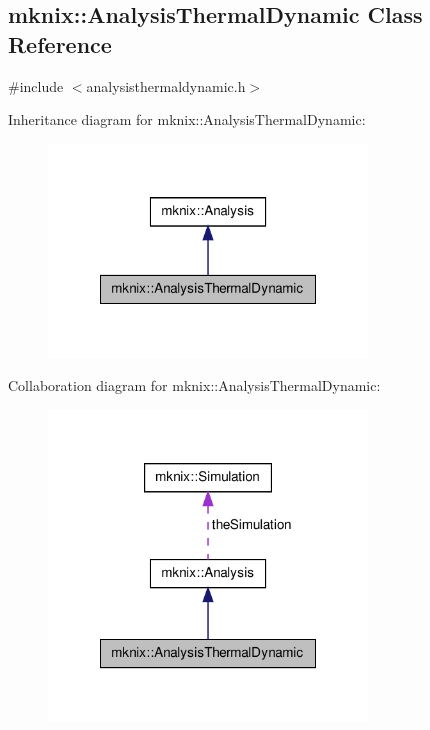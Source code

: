 \hypertarget{classmknix_1_1_analysis_thermal_dynamic}{\subsection{mknix\-:\-:Analysis\-Thermal\-Dynamic Class Reference}
\label{classmknix_1_1_analysis_thermal_dynamic}
}


{\ttfamily \#include $<$analysisthermaldynamic.\-h$>$}



Inheritance diagram for mknix\-:\-:Analysis\-Thermal\-Dynamic\-:\nopagebreak
\begin{figure}[H]
\begin{center}
\leavevmode
\includegraphics[width=240pt]{df/da8/classmknix_1_1_analysis_thermal_dynamic__inherit__graph}
\end{center}
\end{figure}


Collaboration diagram for mknix\-:\-:Analysis\-Thermal\-Dynamic\-:\nopagebreak
\begin{figure}[H]
\begin{center}
\leavevmode
\includegraphics[width=240pt]{db/d46/classmknix_1_1_analysis_thermal_dynamic__coll__graph}
\end{center}
\end{figure}
